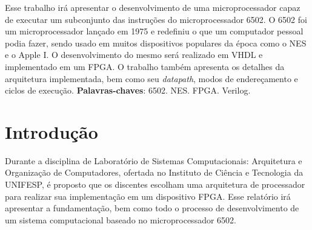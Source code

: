 \documentclass[
	12pt,				  %
	openright,		%
	a4paper,			%
	english,			%
	french,				%
	spanish,			%
	brazil,				%
]{abntex2}
\begin{document}

\frenchspacing


\imprimircapa

\imprimirfolhaderosto*

\setlength{\absparsep}{18pt} %
\begin{resumo}
	Esse trabalho irá apresentar o desenvolvimento de uma microprocessador capaz
	de executar um subconjunto das instruções do microprocessador 6502. O 6502 foi
	um microprocessador lançado em 1975 e redefiniu o que um computador pessoal
	podia fazer, sendo usado em muitos dispositivos populares da época como o NES
	e o Apple I. O desenvolvimento do mesmo será realizado em VHDL e implementado
	em um FPGA. O trabalho também apresenta os detalhes da arquitetura
	implementada, bem como seu \emph{datapath}, modos de endereçamento e ciclos de
	execução. \newline\newline
	\textbf{Palavras-chaves}: 6502. NES. FPGA. Verilog.
	\noindent
\end{resumo}



\listoffigures*
\clearpage

\listoftables*
\clearpage


\tableofcontents*


\textual

\chapter{Introdução}
Durante a disciplina de Laboratório de Sistemas Computacionais:
Arquitetura e Organização de Computadores, ofertada no Instituto de Ciência
e Tecnologia da UNIFESP, é proposto que os discentes
escolham uma arquitetura de processador para realizar sua implementação em um
dispositivo FPGA. Esse relatório irá apresentar a fundamentação, bem como todo
o processo de desenvolvimento de um sistema computacional baseado no
microprocessador 6502.
\end{document}
